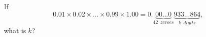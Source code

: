 If \[0.01\times 0.02\times ... \times0.99 \times1.00 = 0. \underbrace{00... 0}_{42\,\,\, zeroes} \underbrace{933...864}_{k\,\,\,  digits},\]what is $k$?
